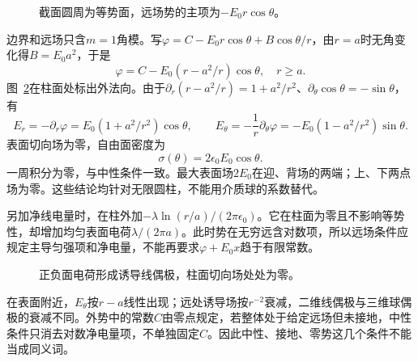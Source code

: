 \begin{figure}[H]\centering
{}
\caption{截面圆周为等势面，远场势的主项为$-E_0r\cos\theta$。}\label{fig:es2-e9-q}
\end{figure}
\begin{solution}
边界和远场只含$m=1$角模。写$\varphi=C-E_0r\cos\theta+B\cos\theta/r$，由$r=a$时无角变化得$B=E_0a^2$，于是
\[\boxed{\varphi=C-E_0(r-a^2/r)\cos\theta},\quad r\ge a.
\]
图~\ref{fig:es2-e9-s}在柱面处标出外法向。由于$\partial_r(r-a^2/r)=1+a^2/r^2$、$\partial_\theta\cos\theta=-\sin\theta$，有
\[E_r=-\partial_r\varphi=E_0(1+a^2/r^2)\cos\theta,\qquad
E_\theta=-\frac1r\partial_\theta\varphi=-E_0(1-a^2/r^2)\sin\theta.\]
表面切向场为零，自由面密度为
\[\sigma(\theta)=2\epsilon_0E_0\cos\theta.\]
一周积分为零，与中性条件一致。最大表面场$2E_0$在迎、背场的两端；上、下两点场为零。这些结论均针对无限圆柱，不能用介质球的系数替代。

另加净线电量时，在柱外加$-\lambda\ln(r/a)/(2\pi\epsilon_0)$。它在柱面为零且不影响等势性，却增加均匀表面电荷$\lambda/(2\pi a)$。此时势在无穷远含对数项，所以远场条件应规定主导匀强项和净电量，不能再要求$\varphi+E_0x$趋于有限常数。
\begin{figure}[H]\centering
{}
\caption{正负面电荷形成诱导线偶极，柱面切向场处处为零。}\label{fig:es2-e9-s}
\end{figure}


在表面附近，$E_\theta$按$r-a$线性出现；远处诱导场按$r^{-2}$衰减，二维线偶极与三维球偶极的衰减不同。外势中的常数$C$由零点规定，若整体处于给定远场但未接地，中性条件只消去对数净电量项，不单独固定$C$。因此中性、接地、零势这几个条件不能当成同义词。
\end{solution}

